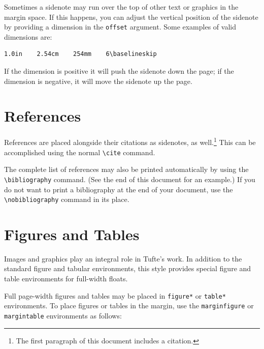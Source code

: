 \documentclass[
  twoside,
  symmetric]{tufte-book}
\begin{document}
Sometimes a sidenote may run over the top of other text or graphics in
the margin space. If this happens, you can adjust the vertical position
of the sidenote by providing a dimension in the \texttt{offset}
argument. Some examples of valid dimensions are:

\begin{verbatim}
1.0in    2.54cm    254mm    6\baselineskip
\end{verbatim}

If the dimension is positive it will push the sidenote down the page; if
the dimension is negative, it will move the sidenote up the page.

\section{References}\label{references}

References are placed alongside their citations as sidenotes, as
well.\footnote{The first paragraph of this document includes a citation.}
This can be accomplished using the normal \texttt{\textbackslash{}cite}
command.

The complete list of references may also be printed automatically by
using the \texttt{\textbackslash{}bibliography} command. (See the end of
this document for an example.) If you do not want to print a
bibliography at the end of your document, use the
\texttt{\textbackslash{}nobibliography} command in its place.

\section{Figures and Tables}\label{sec:figures-and-tables}

Images and graphics play an integral role in Tufte's work. In addition
to the standard figure and tabular environments, this style provides
special figure and table environments for full-width floats.

Full page-width figures and tables may be placed in \texttt{figure*} or
\texttt{table*} environments. To place figures or tables in the margin,
use the \texttt{marginfigure} or \texttt{margintable} environments as
follows:
\end{document}
